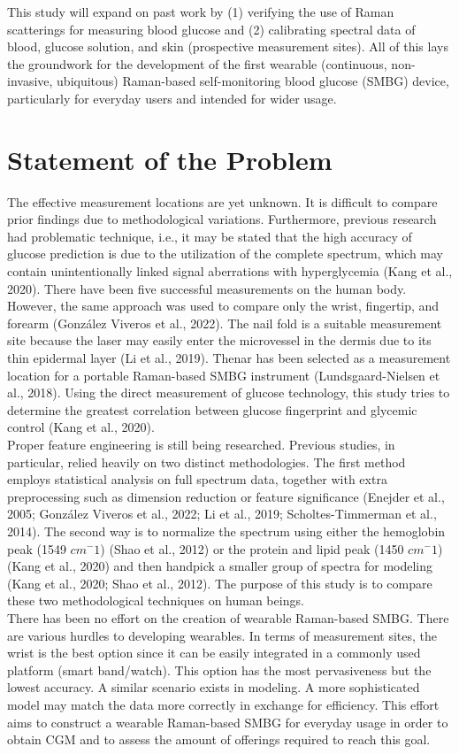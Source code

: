 This study will expand on past work by (1) verifying the use of Raman scatterings for measuring blood glucose and (2) calibrating spectral data of blood, glucose solution, and skin (prospective measurement sites). All of this lays the groundwork for the development of the first wearable (continuous, non-invasive, ubiquitous) Raman-based self-monitoring blood glucose (SMBG) device, particularly for everyday users and intended for wider usage.


\section{Statement of the Problem}
The effective measurement locations are yet unknown. It is difficult to compare prior findings due to methodological variations. Furthermore, previous research had problematic technique, i.e., it may be stated that the high accuracy of glucose prediction is due to the utilization of the complete spectrum, which may contain unintentionally linked signal aberrations with hyperglycemia (Kang et al., 2020). There have been five successful measurements on the human body. However, the same approach was used to compare only the wrist, fingertip, and forearm (González Viveros et al., 2022). The nail fold is a suitable measurement site because the laser may easily enter the microvessel in the dermis due to its thin epidermal layer (Li et al., 2019). Thenar has been selected as a measurement location for a portable Raman-based SMBG instrument (Lundsgaard-Nielsen et al., 2018). Using the direct measurement of glucose technology, this study tries to determine the greatest correlation between glucose fingerprint and glycemic control (Kang et al., 2020).
\\
Proper feature engineering is still being researched. Previous studies, in particular, relied heavily on two distinct methodologies. The first method employs statistical analysis on full spectrum data, together with extra preprocessing such as dimension reduction or feature significance (Enejder et al., 2005; González Viveros et al., 2022; Li et al., 2019; Scholtes-Timmerman et al., 2014). The second way is to normalize the spectrum using either the hemoglobin peak (1549 $cm^-1$) (Shao et al., 2012) or the protein and lipid peak (1450 $cm^-1$) (Kang et al., 2020) and then handpick a smaller group of spectra for modeling (Kang et al., 2020; Shao et al., 2012). The purpose of this study is to compare these two methodological techniques on human beings.
\\
There has been no effort on the creation of wearable Raman-based SMBG. There are various hurdles to developing wearables. In terms of measurement sites, the wrist is the best option since it can be easily integrated in a commonly used platform (smart band/watch). This option has the most pervasiveness but the lowest accuracy. A similar scenario exists in modeling. A more sophisticated model may match the data more correctly in exchange for efficiency. This effort aims to construct a wearable Raman-based SMBG for everyday usage in order to obtain CGM and to assess the amount of offerings required to reach this goal.


